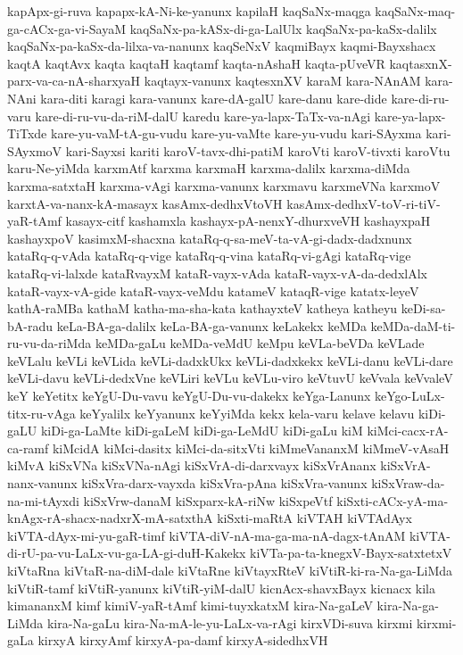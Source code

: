 {kapApx-gi-ruva
kapapx-kA-Ni-ke-yanunx
kapilaH
kaqSaNx-maqga
kaqSaNx-maq-ga-cACx-ga-vi-SayaM
kaqSaNx-pa-kASx-di-ga-LalUlx
kaqSaNx-pa-kaSx-dalilx
kaqSaNx-pa-kaSx-da-lilxa-va-nanunx
kaqSeNxV
kaqmiBayx
kaqmi-Bayxshacx
kaqtA
kaqtAvx
kaqta
kaqtaH
kaqtamf
kaqta-nAshaH
kaqta-pUveVR
kaqtasxnX-parx-va-ca-nA-sharxyaH
kaqtayx-vanunx
kaqtesxnXV
karaM
kara-NAnAM
kara-NAni
kara-diti
karagi
kara-vanunx
kare-dA-galU
kare-danu
kare-dide
kare-di-ru-varu
kare-di-ru-vu-da-riM-dalU
karedu
kare-ya-lapx-TaTx-va-nAgi
kare-ya-lapx-TiTxde
kare-yu-vaM-tA-gu-vudu
kare-yu-vaMte
kare-yu-vudu
kari-SAyxma
kari-SAyxmoV
kari-Sayxsi
kariti
karoV-tavx-dhi-patiM
karoVti
karoV-tivxti
karoVtu
karu-Ne-yiMda
karxmAtf
karxma
karxmaH
karxma-dalilx
karxma-diMda
karxma-satxtaH
karxma-vAgi
karxma-vanunx
karxmavu
karxmeVNa
karxmoV
karxtA-va-nanx-kA-masayx
kasAmx-dedhxVtoVH
kasAmx-dedhxV-toV-ri-tiV-yaR-tAmf
kasayx-citf
kashamxla
kashayx-pA-nenxY-dhurxveVH
kashayxpaH
kashayxpoV
kasimxM-shacxna
kataRq-q-sa-meV-ta-vA-gi-dadx-dadxnunx
kataRq-q-vAda
kataRq-q-vige
kataRq-q-vina
kataRq-vi-gAgi
kataRq-vige
kataRq-vi-lalxde
kataRvayxM
kataR-vayx-vAda
kataR-vayx-vA-da-dedxlAlx
kataR-vayx-vA-gide
kataR-vayx-veMdu
katameV
kataqR-vige
katatx-leyeV
kathA-raMBa
kathaM
katha-ma-sha-kata
kathayxteV
katheya
katheyu
keDi-sa-bA-radu
keLa-BA-ga-dalilx
keLa-BA-ga-vanunx
keLakekx
keMDa
keMDa-daM-ti-ru-vu-da-riMda
keMDa-gaLu
keMDa-veMdU
keMpu
keVLa-beVDa
keVLade
keVLalu
keVLi
keVLida
keVLi-dadxkUkx
keVLi-dadxkekx
keVLi-danu
keVLi-dare
keVLi-davu
keVLi-dedxVne
keVLiri
keVLu
keVLu-viro
keVtuvU
keVvala
keVvaleV
keY
keYetitx
keYgU-Du-vavu
keYgU-Du-vu-dakekx
keYga-Lanunx
keYgo-LuLx-titx-ru-vAga
keYyalilx
keYyanunx
keYyiMda
kekx
kela-varu
kelave
kelavu
kiDi-gaLU
kiDi-ga-LaMte
kiDi-gaLeM
kiDi-ga-LeMdU
kiDi-gaLu
kiM
kiMci-cacx-rA-ca-ramf
kiMcidA
kiMci-dasitx
kiMci-da-sitxVti
kiMmeVananxM
kiMmeV-vAsaH
kiMvA
kiSxVNa
kiSxVNa-nAgi
kiSxVrA-di-darxvayx
kiSxVrAnanx
kiSxVrA-nanx-vanunx
kiSxVra-darx-vayxda
kiSxVra-pAna
kiSxVra-vanunx
kiSxVraw-da-na-mi-tAyxdi
kiSxVrw-danaM
kiSxparx-kA-riNw
kiSxpeVtf
kiSxti-cACx-yA-ma-knAgx-rA-shacx-nadxrX-mA-satxthA
kiSxti-maRtA
kiVTAH
kiVTAdAyx
kiVTA-dAyx-mi-yu-gaR-timf
kiVTA-diV-nA-ma-ga-ma-nA-dagx-tAnAM
kiVTA-di-rU-pa-vu-LaLx-vu-ga-LA-gi-duH-Kakekx
kiVTa-pa-ta-knegxV-Bayx-satxtetxV
kiVtaRna
kiVtaR-na-diM-dale
kiVtaRne
kiVtayxRteV
kiVtiR-ki-ra-Na-ga-LiMda
kiVtiR-tamf
kiVtiR-yanunx
kiVtiR-yiM-dalU
kicnAcx-shavxBayx
kicnacx
kila
kimananxM
kimf
kimiV-yaR-tAmf
kimi-tuyxkatxM
kira-Na-gaLeV
kira-Na-ga-LiMda
kira-Na-gaLu
kira-Na-mA-le-yu-LaLx-va-rAgi
kirxVDi-suva
kirxmi
kirxmi-gaLa
kirxyA
kirxyAmf
kirxyA-pa-damf
kirxyA-sidedhxVH
}
